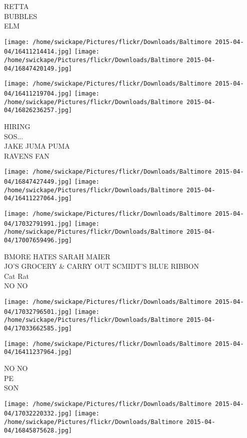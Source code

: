 \documentclass[10pt,letterpaper]{article}
\begin{document}
RETTA\\
BUBBLES\\
ELM\\
\pagebreak

\texttt{[image: /home/swickape/Pictures/flickr/Downloads/Baltimore 2015-04-04/16411214414.jpg]}
\texttt{[image: /home/swickape/Pictures/flickr/Downloads/Baltimore 2015-04-04/16847420149.jpg]}

\texttt{[image: /home/swickape/Pictures/flickr/Downloads/Baltimore 2015-04-04/16411219704.jpg]}
\texttt{[image: /home/swickape/Pictures/flickr/Downloads/Baltimore 2015-04-04/16826236257.jpg]}

HIRING\\
SOS...\\
JAKE JUMA PUMA\\
RAVENS FAN\\
\pagebreak

\texttt{[image: /home/swickape/Pictures/flickr/Downloads/Baltimore 2015-04-04/16847427449.jpg]}
\texttt{[image: /home/swickape/Pictures/flickr/Downloads/Baltimore 2015-04-04/16411227064.jpg]}

\texttt{[image: /home/swickape/Pictures/flickr/Downloads/Baltimore 2015-04-04/17032791991.jpg]}
\texttt{[image: /home/swickape/Pictures/flickr/Downloads/Baltimore 2015-04-04/17007659496.jpg]}

BMORE HATES SARAH MAIER\\
JO'S GROCERY \& CARRY OUT SCMIDT'S BLUE RIBBON\\
Cat Rat\\
NO NO\\
\pagebreak

\texttt{[image: /home/swickape/Pictures/flickr/Downloads/Baltimore 2015-04-04/17032796501.jpg]}
\texttt{[image: /home/swickape/Pictures/flickr/Downloads/Baltimore 2015-04-04/17033662585.jpg]}

\vspace{0.25in}
\texttt{[image: /home/swickape/Pictures/flickr/Downloads/Baltimore 2015-04-04/16411237964.jpg]}

NO NO\\
PE\\
SON\\
\pagebreak

\texttt{[image: /home/swickape/Pictures/flickr/Downloads/Baltimore 2015-04-04/17032220332.jpg]}
\texttt{[image: /home/swickape/Pictures/flickr/Downloads/Baltimore 2015-04-04/16845875628.jpg]}
\end{document}
